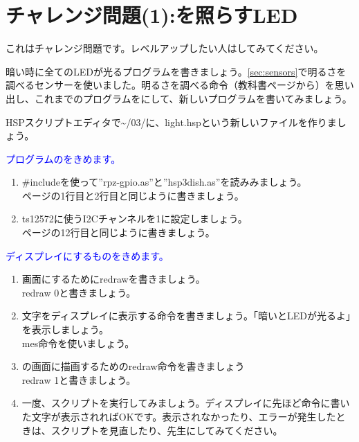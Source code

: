 \newpage
\section{チャレンジ問題(1):を照らすLED}
\label{Yamiyo}
これはチャレンジ問題です。レベルアップしたい人はしてみてください。

暗い時に全てのLEDが光るプログラムを書きましょう。\ref{sec:sensors}で明るさを調べるセンサーを使いました。明るさを調べる命令（教科書\pageref{sec:sensors}ページから）を思い出し、これまでのプログラムをにして、新しいプログラムを書いてみましょう。\\
\begin{enumerate}
\renewcommand{\theenumii}{\arabic{enumii}}
\renewcommand{\labelenumii}{\theenumi.\theenumii}
\item HSPスクリプトエディタで\textasciitilde /03/に、light.hspという新しいファイルを作りましょう。
\textcolor{blue}{\item プログラムのをきめます。}
\begin{enumerate}
\item \#includeを使って”rpz-gpio.as”と”hsp3dish.as”を読みみましょう。\\
\pageref{sensors.hsp}ページの1行目と2行目と同じように書きましょう。
\item ts12572に使うI2Cチャンネルを1に設定しましょう。\\
\pageref{sensors.hsp}ページの12行目と同じように書きましょう。
\end{enumerate}
\textcolor{blue}{\item ディスプレイにするものをきめます。}
\begin{enumerate}
\item {}画面にするためにredrawを書きましょう。\\
redraw 0と書きましょう。
\item 文字をディスプレイに表示する命令を書きましょう。「暗いとLEDが光るよ」を表示しましょう。\\
mes命令を使いましょう。
\item {}の画面に描画するためのredraw命令を書きましょう\\
redraw 1と書きましょう。
\item 一度、スクリプトを実行してみましょう。ディスプレイに先ほど命令に書いた文字が表示されればOKです。表示されなかったり、エラーが発生したときは、スクリプトを見直したり、先生にしてみてください。

\end{enumerate}
\end{enumerate}
